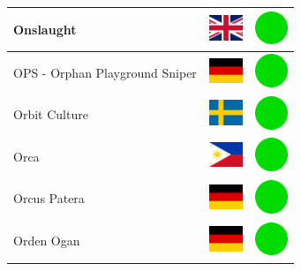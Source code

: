 \documentclass[12pt, a4paper, twoside]{report}
\begin{document}
\begin{center}
\begin{longtable}{|p{5cm}|p{2cm}|p{2cm}|}
Onslaught & \includegraphics[width=1cm]{4x3/gb} & \includegraphics[width=1cm]{likes/y} \\ \hline
OPS - Orphan Playground Sniper & \includegraphics[width=1cm]{4x3/de} & \includegraphics[width=1cm]{likes/y} \\ \hline
Orbit Culture & \includegraphics[width=1cm]{4x3/se} & \includegraphics[width=1cm]{likes/y} \\ \hline
Orca & \includegraphics[width=1cm]{4x3/ph} & \includegraphics[width=1cm]{likes/y} \\ \hline
Orcus Patera & \includegraphics[width=1cm]{4x3/de} & \includegraphics[width=1cm]{likes/y} \\ \hline
Orden Ogan & \includegraphics[width=1cm]{4x3/de} & \includegraphics[width=1cm]{likes/y} \\ \hline

\end{longtable}
\end{center}
\end{document}
